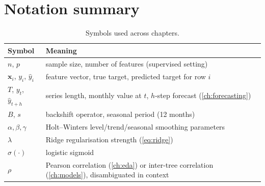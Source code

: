 \section{Notation summary}
\begin{table}[H]
  \centering
  \caption{Symbols used across chapters.}
  \begin{tabular}{@{}l>{\raggedright\arraybackslash}p{11.2cm}@{}}
    \toprule
    Symbol & Meaning \\
    \midrule
    $n$, $p$ & sample size, number of features (supervised setting) \\
    $\mathbf x_i$, $y_i$, $\hat y_i$ & feature vector, true target, predicted target for row $i$ \\
    $T$, $y_t$, $\hat y_{t+h}$ & series length, monthly value at $t$, $h$-step forecast (\cref{ch:forecasting}) \\
    $B$, $s$ & backshift operator, seasonal period (12 months) \\
    $\alpha,\beta,\gamma$ & Holt--Winters level/trend/seasonal smoothing parameters \\
    $\lambda$ & Ridge regularisation strength (\cref{eq:ridge}) \\
    $\sigma(\cdot)$ & logistic sigmoid \\
    $\rho$ & Pearson correlation (\cref{ch:eda}) or inter-tree correlation (\cref{ch:models}), disambiguated in context \\
    \bottomrule
  \end{tabular}
\end{table}
